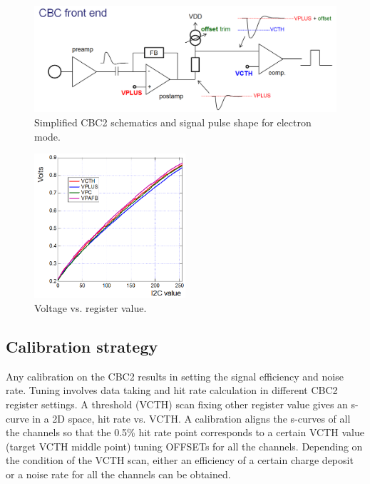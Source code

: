 \documentclass[11pt,a4paper]{article}
\begin{document}
	\begin{figure}[htbp]
	\centering
	\includegraphics[width=\textwidth]{fig/CBC.png}
	\caption{Simplified CBC2 schematics and signal pulse shape for electron mode. }\label{fig:CBC2}
	\end{figure}

	\begin{figure}[htbp]
	\centering
	\includegraphics[width=0.5\textwidth]{fig/VoltI2c.png}
	\caption{Voltage vs. register value. }\label{fig:volt-i2c}
	\end{figure}

	\subsection{Calibration strategy}
	Any calibration on the CBC2 results in setting the signal efficiency and noise rate.
	Tuning involves data taking and hit rate calculation in different CBC2 register settings. 
	A threshold (VCTH) scan fixing other register value gives an s-curve in a 2D space, hit rate vs. VCTH.
	A calibration aligns the s-curves of all the channels so that the 0.5\% hit rate point corresponds to
	a certain VCTH value (target VCTH middle point) tuning OFFSETs for all the channels. 
	Depending on the condition of the VCTH scan, either an efficiency of a certain charge deposit or a noise rate
	for all the channels can be obtained. 
\end{document}
